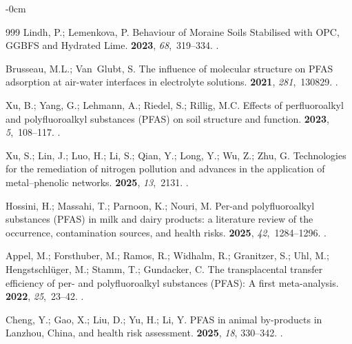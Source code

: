 \documentclass[environremediat,article,accept,pdftex,oneauthor]{Definitions/mdpi}
\begin{document}
\begin{adjustwidth}{-\extralength}{0cm}
\begin{thebibliography}{999}
Lindh, P.; Lemenkova, P.
\newblock Behaviour of Moraine Soils Stabilised with OPC, GGBFS and Hydrated
  Lime.
 {\bf 2023}, {\em 68},~319--334.
.

Brusseau, M.L.; Van~Glubt, S.
\newblock The influence of molecular structure on PFAS adsorption at air-water
  interfaces in electrolyte solutions.
 {\bf 2021}, {\em 281},~130829.
.

Xu, B.; Yang, G.; Lehmann, A.; Riedel, S.; Rillig, M.C.
\newblock Effects of perfluoroalkyl and polyfluoroalkyl substances (PFAS) on
  soil structure and function.
 {\bf 2023}, {\em 5},~108--117.
.

Xu, S.; Lin, J.; Luo, H.; Li, S.; Qian, Y.; Long, Y.; Wu, Z.; Zhu, G.
\newblock Technologies for the remediation of nitrogen pollution and advances
  in the application of metal--phenolic networks.
 {\bf 2025}, {\em 13},~2131.
.

Hossini, H.; Massahi, T.; Parnoon, K.; Nouri, M.
\newblock Per-and polyfluoroalkyl substances (PFAS) in milk and dairy products:
  a literature review of the occurrence, contamination sources, and health
  risks.
 {\bf 2025}, {\em
  42},~1284--1296.
.

Appel, M.; Forsthuber, M.; Ramos, R.; Widhalm, R.; Granitzer, S.; Uhl, M.;
  Hengstschl{\"u}ger, M.; Stamm, T.; Gundacker, C.
\newblock The transplacental transfer efficiency of per- and polyfluoroalkyl
  substances (PFAS): A first meta-analysis.
 {\bf
  2022}, {\em 25},~23--42.
.

Cheng, Y.; Gao, X.; Liu, D.; Yu, H.; Li, Y.
\newblock PFAS in animal by-products in Lanzhou, China, and health risk
  assessment.
 {\bf 2025}, \textit{18}, 330--342. %
.


\end{thebibliography}
\end{adjustwidth}
\end{document}

